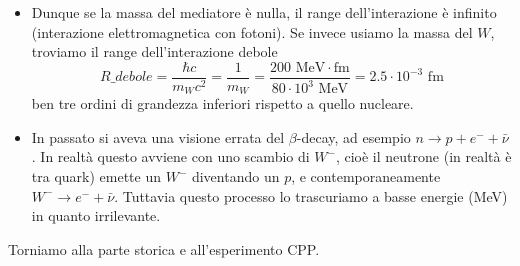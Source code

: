 \begin{itemize}
    \item Dunque se la massa del mediatore è nulla, il range dell'interazione è infinito (interazione elettromagnetica con fotoni). Se invece usiamo la massa del $W$, troviamo il range dell'interazione debole 
    \begin{equation*}
    R\_{debole}=\frac{\hbar c}{m_Wc^2}=\frac1{m_W}=\frac{200\text{ MeV}\cdot\text{fm}}{80\cdot 10^3\text{ MeV}}=2.5\cdot10^{-3}\text{ fm}
    \end{equation*}
    ben tre ordini di grandezza inferiori rispetto a quello nucleare.
    \item In passato si aveva una visione errata del $\beta$-decay, ad esempio $n\to p+e^-+\bar\nu$. In realtà questo avviene con uno scambio di $W^-$, cioè il neutrone (in realtà è tra quark) emette un $W^-$ diventando un $p$, e contemporaneamente $W^-\to e^-+\bar\nu$. Tuttavia questo processo lo trascuriamo a basse energie (MeV) in quanto irrilevante. 
\end{itemize}
Torniamo alla parte storica e all'esperimento CPP.
